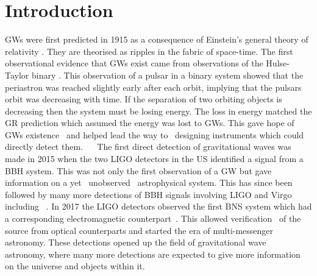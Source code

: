 \chapter{\label{intro}Introduction}


\Glspl{GW} were first predicted in 1915 as a consequence of Einstein's general
theory of relativity \citep{einstein2005GrundlageAllgemeinen}.  They are
theorised as ripples in the fabric of space-time.  The first observational
evidence that \glspl{GW} exist came from observations of the Hulse-Taylor
binary \citep{weisberg1981GravitationalWaves,weisberg2004RelativisticBinary}.
This observation of a pulsar in a binary system showed that the periastron was
reached slightly early after each orbit, implying that the pulsars orbit was
decreasing with time.  If the separation of two orbiting objects is decreasing
then the system must be losing energy.  The loss in energy matched the \gls{GR}
prediction which assumed the energy was lost to \glspl{GW}.  This gave hope of
\glspl{GW} existence~ and helped lead the way
to~ designing instruments
which could directly detect them.~ ~ The first direct detection of gravitational
waves was made in 2015 when the two \gls{LIGO} detectors in the US
\citep{abbott2016ObservationGravitational} identified a signal from a \gls{BBH}
system.  This was not only the first observation of a \gls{GW} but gave
information on a yet~ unobserved~ astrophysical
system.  This has since been followed by many more detections of \gls{BBH}
signals involving \gls{LIGO} and Virgo including
\citep{abbott2017GW170814ThreeDetector,theligoscientificcollaboration2020GW190425Observation}~.  In 2017 the \gls{LIGO} detectors observed the
first \gls{BNS} system \citep{abbott2017GW170817Observation} which had a
corresponding electromagnetic counterpart~.  This allowed verification~ of the source from optical counterparts and started the era of
multi-messenger astronomy.  These detections opened up the field of
gravitational wave~ astronomy, where many more detections are expected to give more
information on the universe and objects within it.

